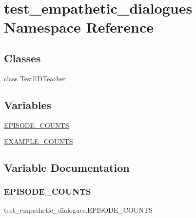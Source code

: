 \hypertarget{namespacetest__empathetic__dialogues}{}\section{test\+\_\+empathetic\+\_\+dialogues Namespace Reference}
\label{namespacetest__empathetic__dialogues}
\subsection*{Classes}
\begin{DoxyCompactItemize}
\item 
class \hyperlink{classtest__empathetic__dialogues_1_1TestEDTeacher}{Test\+E\+D\+Teacher}
\end{DoxyCompactItemize}
\subsection*{Variables}
\begin{DoxyCompactItemize}
\item 
\hyperlink{namespacetest__empathetic__dialogues_a385614dfcc1e4499f94caa5346cc982c}{E\+P\+I\+S\+O\+D\+E\+\_\+\+C\+O\+U\+N\+TS}
\item 
\hyperlink{namespacetest__empathetic__dialogues_ae088bc4fa4d81d6baba63cf2e18a7b34}{E\+X\+A\+M\+P\+L\+E\+\_\+\+C\+O\+U\+N\+TS}
\end{DoxyCompactItemize}


\subsection{Variable Documentation}
\mbox{\label{namespacetest__empathetic__dialogues_a385614dfcc1e4499f94caa5346cc982c}} 
\subsubsection{\texorpdfstring{E\+P\+I\+S\+O\+D\+E\+\_\+\+C\+O\+U\+N\+TS}{EPISODE\_COUNTS}}
{\footnotesize\ttfamily test\+\_\+empathetic\+\_\+dialogues.\+E\+P\+I\+S\+O\+D\+E\+\_\+\+C\+O\+U\+N\+TS}



